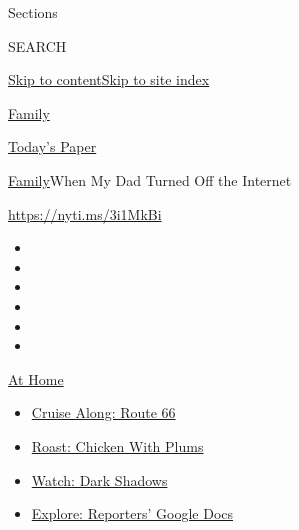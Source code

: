Sections

SEARCH

\protect\hyperlink{site-content}{Skip to
content}\protect\hyperlink{site-index}{Skip to site index}

\href{https://www.nytimes3xbfgragh.onion/section/well/family}{Family}

\href{https://myaccount.nytimes3xbfgragh.onion/auth/login?response_type=cookie\&client_id=vi}{}

\href{https://www.nytimes3xbfgragh.onion/section/todayspaper}{Today's
Paper}

\href{/section/well/family}{Family}\textbar{}When My Dad Turned Off the
Internet

\url{https://nyti.ms/3i1MkBi}

\begin{itemize}
\item
\item
\item
\item
\item
\item
\end{itemize}

\href{https://www.nytimes3xbfgragh.onion/spotlight/at-home?action=click\&pgtype=Article\&state=default\&region=TOP_BANNER\&context=at_home_menu}{At
Home}

\begin{itemize}
\tightlist
\item
  \href{https://www.nytimes3xbfgragh.onion/2020/09/07/travel/route-66.html?action=click\&pgtype=Article\&state=default\&region=TOP_BANNER\&context=at_home_menu}{Cruise
  Along: Route 66}
\item
  \href{https://www.nytimes3xbfgragh.onion/2020/09/04/dining/sheet-pan-chicken.html?action=click\&pgtype=Article\&state=default\&region=TOP_BANNER\&context=at_home_menu}{Roast:
  Chicken With Plums}
\item
  \href{https://www.nytimes3xbfgragh.onion/2020/09/04/arts/television/dark-shadows-stream.html?action=click\&pgtype=Article\&state=default\&region=TOP_BANNER\&context=at_home_menu}{Watch:
  Dark Shadows}
\item
  \href{https://www.nytimes3xbfgragh.onion/interactive/2020/at-home/even-more-reporters-editors-diaries-lists-recommendations.html?action=click\&pgtype=Article\&state=default\&region=TOP_BANNER\&context=at_home_menu}{Explore:
  Reporters' Google Docs}
\end{itemize}

